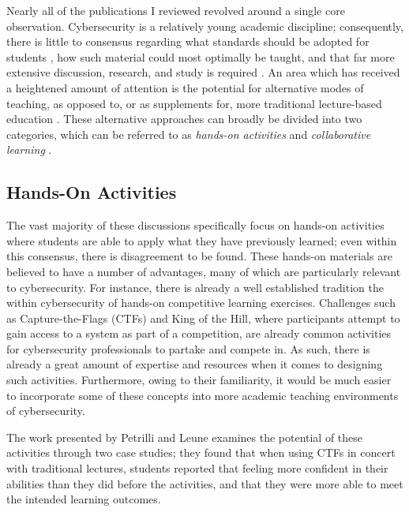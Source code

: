 \documentclass{article}
\begin{document}
    Nearly all of the publications I reviewed revolved around a single core observation. Cybersecurity is a relatively young academic discipline; consequently, there is little to consensus regarding what standards should be adopted for students \cite{R-Raj}, how such material could most optimally be taught, and that far more extensive discussion, research, and study is required \cite{Z-Zeng}. An area which has received a heightened amount of attention is the potential for alternative modes of teaching, as opposed to, or as supplements for, more traditional lecture-based education \cite{Z-Zeng,N-Eliot,E-Gavas,C-Herr,K-Chung, C-Kussmaul,K-Leune,B-Payne,L-Thomas}. These alternative approaches can broadly be divided into two categories, which can be referred to as \emph{hands-on activities} and \emph{collaborative learning} \cite{P-Deshpande,C-Kussmaul,B-Payne}.

\subsection{Hands-On Activities}

    The vast majority of these discussions specifically focus on hands-on activities where students are able to apply what they have previously learned; even within this consensus, there is disagreement to be found. These hands-on materials are believed to have a number of advantages, many of which are particularly relevant to cybersecurity. For instance, there is already a well established tradition the within cybersecurity of hands-on competitive learning exercises. Challenges such as Capture-the-Flags (CTFs) and King of the Hill, where participants attempt to gain access to a system as part of a competition, are already common activities for cybersecurity professionals to partake and compete in. As such, there is already a great amount of expertise and resources when it comes to designing such activities. Furthermore, owing to their familiarity, it would be much easier to incorporate some of these concepts into more academic teaching environments of cybersecurity.

    The work presented by Petrilli and Leune examines the potential of these activities through two case studies; they found that when using CTFs in concert with traditional lectures, students reported that feeling more confident in their abilities than they did before the activities, and that they were more able to meet the intended learning outcomes. 
\end{document}
